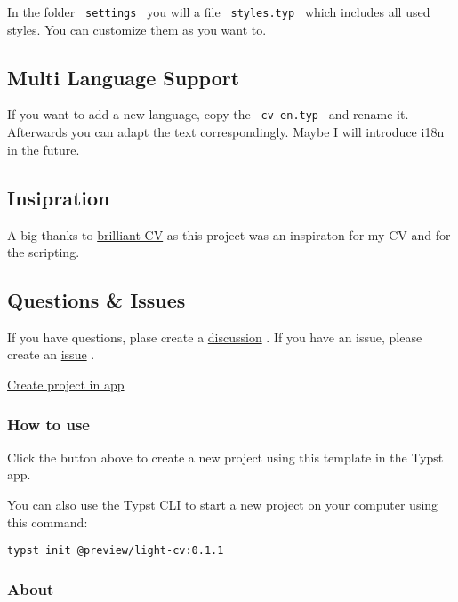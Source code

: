 In the folder \texttt{\ settings\ } you will a file
\texttt{\ styles.typ\ } which includes all used styles. You can
customize them as you want to.

\subsection{Multi Language Support}\label{multi-language-support}

If you want to add a new language, copy the \texttt{\ cv-en.typ\ } and
rename it. Afterwards you can adapt the text correspondingly. Maybe I
will introduce i18n in the future.

\subsection{Insipration}\label{insipration}

A big thanks to
\href{https://github.com/mintyfrankie/brilliant-CV}{brilliant-CV} as
this project was an inspiraton for my CV and for the scripting.

\subsection{Questions \& Issues}\label{questions-issues}

If you have questions, plase create a
\href{https://github.com/AnsgarLichter/light-cv/discussions}{discussion}
. If you have an issue, please create an
\href{https://github.com/AnsgarLichter/light-cv/issues}{issue} .

\href{/app?template=light-cv&version=0.1.1}{Create project in app}

\subsubsection{How to use}\label{how-to-use}

Click the button above to create a new project using this template in
the Typst app.

You can also use the Typst CLI to start a new project on your computer
using this command:

\begin{verbatim}
typst init @preview/light-cv:0.1.1
\end{verbatim}



\subsubsection{About}\label{about}

